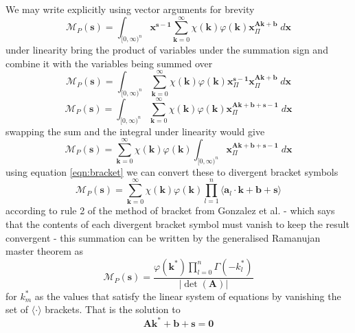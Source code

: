 \documentclass{article}
\begin{document}
We may write explicitly using vector arguments for brevity
\begin{equation}
\mathcal{M}_P(\mathbf{s}) = \int_{[0,\infty)^{n}} \mathbf{x}^{\mathbf{s-1}} \sum_{\mathbf{k}=0}^\infty  \chi(\mathbf{k})\varphi(\mathbf{k}) \mathbf{x}^{\mathbf{A}\mathbf{k}+\mathbf{b}}_\Pi \; d \mathbf{x}
\end{equation}
under linearity bring the product of variables under the summation sign and combine it with the variables being summed over
\begin{equation}
\mathcal{M}_P(\mathbf{s}) = \int_{[0,\infty)^{n}} \sum_{\mathbf{k}=0}^\infty  \chi(\mathbf{k})\varphi(\mathbf{k}) \mathbf{x}^{\mathbf{s-1}}_\Pi \mathbf{x}^{\mathbf{A}\mathbf{k}+\mathbf{b}}_\Pi \; d \mathbf{x}
\end{equation}
\begin{equation}
\mathcal{M}_P(\mathbf{s}) = \int_{[0,\infty)^{n}} \sum_{\mathbf{k}=0}^\infty  \chi(\mathbf{k})\varphi(\mathbf{k})\mathbf{x}^{\mathbf{A}\mathbf{k}+\mathbf{b}+\mathbf{s-1}}_\Pi \; d \mathbf{x}
\end{equation}
swapping the sum and the integral under linearity would give
\begin{equation}
\mathcal{M}_P(\mathbf{s}) = \sum_{\mathbf{k}=0}^\infty  \chi(\mathbf{k})\varphi(\mathbf{k})\int_{[0,\infty)^{n}} \mathbf{x}^{\mathbf{A}\mathbf{k}+\mathbf{b}+\mathbf{s-1}}_\Pi \; d \mathbf{x}
\end{equation}
using equation \ref{eqn:bracket} we can convert these to divergent bracket symbols
\begin{equation}
\mathcal{M}_P(\mathbf{s}) = \sum_{\mathbf{k}=0}^\infty  \chi(\mathbf{k})\varphi(\mathbf{k}) \prod_{l=1}^n \langle \mathbf{a}_l \cdot \mathbf{k} + \mathbf{b} + \mathbf{s} \rangle
\end{equation}
according to rule 2 of the method of bracket from Gonzalez et al. \cite{Gonzalez2015} - which says that the contents of each divergent bracket symbol must vanish to keep the result convergent - this summation can be written by the generalised Ramanujan master theorem as 
\begin{equation}
\mathcal{M}_P(\mathbf{s}) = \frac{\varphi(\mathbf{k}^*) \prod_{l=0}^n \Gamma(-k_l^*)}{|\det(\mathbf{A})|}
\end{equation}
for $k^*_m$ as the values that satisfy the linear system of equations by vanishing the set of $\langle \cdot \rangle$ brackets. That is the solution to \begin{equation}
\mathbf{A}\mathbf{k}^*+\mathbf{b}+\mathbf{s} = \mathbf{0}
\end{equation} 
\end{document}
